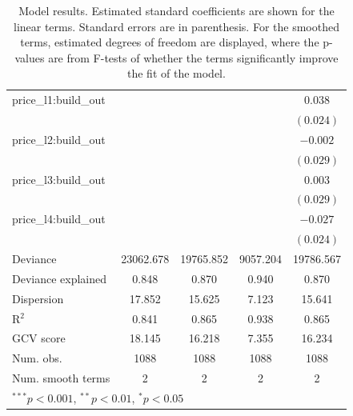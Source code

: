 \documentclass[12pt]{article}
\begin{document}
\begin{table}
\begin{center}
\begin{tabular}{l c c c c }
price\_l1:build\_out                   &                &                &                  & $0.038$        \\
                                             &                &                &                  & $(0.024)$      \\
price\_l2:build\_out                   &                &                &                  & $-0.002$       \\
                                             &                &                &                  & $(0.029)$      \\
price\_l3:build\_out                   &                &                &                  & $0.003$        \\
                                             &                &                &                  & $(0.029)$      \\
price\_l4:build\_out                   &                &                &                  & $-0.027$       \\
                                             &                &                &                  & $(0.024)$      \\
\hline
Deviance                                     & 23062.678      & 19765.852      & 9057.204         & 19786.567      \\
Deviance explained                           & 0.848          & 0.870          & 0.940            & 0.870          \\
Dispersion                                   & 17.852         & 15.625         & 7.123            & 15.641         \\
R$^2$                                        & 0.841          & 0.865          & 0.938            & 0.865          \\
GCV score                                    & 18.145         & 16.218         & 7.355            & 16.234         \\
Num. obs.                                    & 1088           & 1088           & 1088             & 1088           \\
Num. smooth terms                            & 2              & 2              & 2                & 2              \\
\hline
\multicolumn{5}{l}{\scriptsize{$^{***}p<0.001$, $^{**}p<0.01$, $^*p<0.05$}}
\end{tabular}
\caption{Model results. Estimated standard coefficients are shown for the linear terms. Standard errors are in parenthesis. For the smoothed terms, estimated degrees of freedom are displayed, where the p-values are from F-tests of whether the terms significantly improve the fit of the model.}
\label{GAM_model_table}
\end{center}
\end{table}
\end{document}
